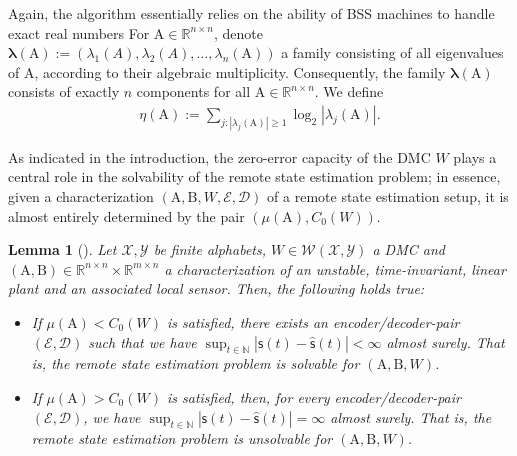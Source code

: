 \documentclass[conference]{IEEEtran}
\newcommand{\rs}{\mathsf{s}}
\def\E{{\mathcal E}}
\def\D{{\mathcal D}}
\def\X{{\mathcal X}}
\def\Y{{\mathcal Y}}
\def\W{{\mathcal W}}
\def\NN{{\mathbb N}}
\def\RR{{\mathbb R}}
\def\mA{\bm{\mathrm{A}}}
\def\mB{\bm{\mathrm{B}}}
\newtheorem{Lemma}[Theorem]{Lemma}
\begin{document}
	Again, the algorithm essentially relies on the ability of BSS machines to handle exact real numbers 
	For \(\mA \in \RR^{n\times n}\), denote \(\bm{\lambda}(\mA) := (\lambda_1(A),\lambda_2(A),\ldots,\lambda_n(\mA))\) a family 
	consisting of all eigenvalues of \(\mA\), according to their algebraic multiplicity. Consequently, the family \(\bm{\lambda}(\mA)\)
	consists of exactly \(n\) components for all \(\mA\in \RR^{n\times n}\). We define
	\begin{align}	\eta(\mA):={\sum}_{j:|\lambda_j(\mA)|\geq 1} \log_2|\lambda_j(\mA)|.
	\end{align}
	
	As indicated in the introduction, the zero-error capacity of the DMC \(W\) plays a central role in the solvability of the remote state estimation problem;
	in essence, given a characterization \((\mA,\mB,W,\E,\D)\) of a remote state estimation setup, it is almost entirely determined by the pair \((\mu(\mA),C_0(W))\).
	
	\begin{Lemma} 	[\cite{MS07}]\label{lem:SolvabilityCondition} Let \(\X,\Y\) be finite alphabets, \(W\in \W(\X,\Y)\) a DMC and \((\mA,\mB) \in \RR^{n\times n}\times \RR^{m\times n}\) 
					a characterization of an unstable, time-invariant, linear plant and an associated local sensor. Then, the following holds true:
					\begin{itemize}	\item If \(\mu(\mA) < C_0(W)\) is satisfied, there exists an encoder/decoder-pair \((\E,\D)\) such that we have
										\(
											\sup_{t\in\NN} |\rs(t) - \hat{\rs}(t)| < \infty 
										\) almost surely.
										That is, the remote state estimation problem is \emph{solvable} for \((\mA,\mB, W)\).
									\item If \(\mu(\mA) > C_0(W)\) is satisfied, then, for every encoder/decoder-pair \((\E,\D)\), we have\linebreak 
										\(
											\sup_{t\in\NN} |\rs(t) - \hat{\rs}(t)| = \infty 
										\) almost surely.
										That is, the remote state estimation problem is \emph{unsolvable} for \((\mA,\mB, W)\).
					\end{itemize}
	\end{Lemma} 
	
\end{document}
